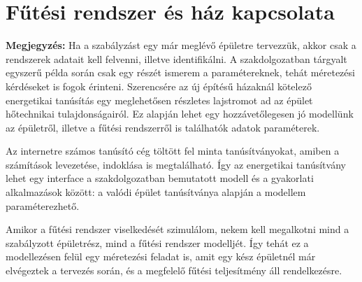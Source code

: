 

\section{Fűtési rendszer és ház kapcsolata}

\begin{formal}
	\textbf{Megjegyzés:}
	Ha a szabályzást egy már meglévő épületre tervezzük, akkor csak a rendszerek adatait kell felvenni, illetve identifikálni. A szakdolgozatban tárgyalt egyszerű példa során csak egy részét ismerem a paramétereknek, tehát méretezési kérdéseket is fogok érinteni.  Szerencsére az új építésű házaknál kötelező energetikai tanúsítás%
 egy meglehetősen részletes lajstromot ad az épület hőtechnikai tulajdonságairól. Ez alapján lehet egy hozzávetőlegesen jó modellünk az épületről, illetve a fűtési rendszerről is találhatók adatok paraméterek.

\end{formal}



 Az internetre számos tanúsító cég töltött fel minta tanúsítványokat, amiben a számítások levezetése, indoklása is megtalálható. Így az energetikai tanúsítvány lehet egy interface a szakdolgozatban bemutatott modell és a gyakorlati alkalmazások között: a valódi épület tanúsítványa alapján a modellem paraméterezhető.


Amikor a fűtési rendszer viselkedését szimulálom, nekem kell megalkotni mind a szabályzott épületrész, mind a fűtési rendszer modelljét. Így tehát ez a modellezésen felül egy méretezési feladat is, amit egy kész épületnél már elvégeztek a tervezés során, és a megfelelő fűtési teljesítmény áll rendelkezésre. %






%
%
%




\pagebreak
